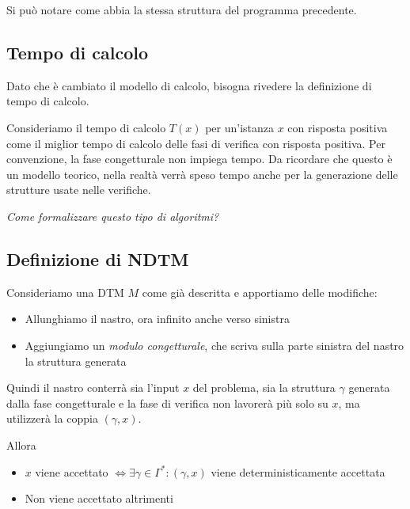Si può notare come abbia la stessa struttura del programma precedente.

\subsection{Tempo di calcolo}

Dato che è cambiato il modello di calcolo, bisogna rivedere la definizione di tempo di calcolo. 

Consideriamo il tempo di calcolo $T(x)$ per un'istanza $x$ con risposta positiva come il miglior tempo di calcolo delle fasi di verifica con risposta positiva. Per convenzione, la fase congetturale non impiega tempo. Da ricordare che questo è un modello teorico, nella realtà verrà speso tempo anche per la generazione delle strutture usate nelle verifiche. 

\textit{Come formalizzare questo tipo di algoritmi?}

\subsection{Definizione di NDTM}

Consideriamo una DTM $M$ come già descritta e apportiamo delle modifiche: 
\begin{itemize}
	\item Allunghiamo il nastro, ora infinito anche verso sinistra
    
	\item Aggiungiamo un \textit{modulo congetturale}, che scriva sulla parte sinistra del nastro la struttura generata
\end{itemize}

Quindi il nastro conterrà sia l'input $x$ del problema, sia la struttura $\gamma$ generata dalla fase congetturale e la fase di verifica non lavorerà più solo su $x$, ma utilizzerà la coppia $(\gamma, x)$. 

Allora 
\begin{itemize}
	\item $x$ viene accettato $\Leftrightarrow \exists \gamma \in \Gamma^\ast: (\gamma, x)$ viene deterministicamente accettata
    
	\item Non viene accettato altrimenti 
\end{itemize}

